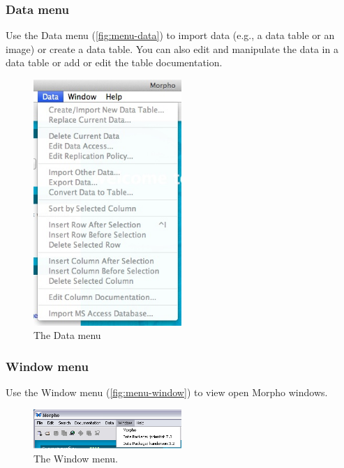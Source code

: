 \subsubsection{Data menu} \label{sec:menu-data}

Use the Data menu (\autoref{fig:menu-data}) to import data (e.g., a data
table or an image) or create a data table. You can also edit and
manipulate the data in a data table or add or edit the table
documentation. 

\begin{figure}
  \centering
    \includegraphics[width=0.5\textwidth]{images/menu-data.jpg}
  \caption{The Data menu}
  \label{fig:menu-data}
\end{figure}

\subsubsection{Window menu} \label{sec:menu-window}

Use the Window menu (\autoref{fig:menu-window}) to view open Morpho
windows. 

\begin{figure}
  \centering
    \includegraphics[width=0.5\textwidth]{images/menu-window.jpg}
  \caption{The Window menu.}
  \label{fig:menu-window}
\end{figure}

